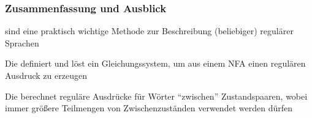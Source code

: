 \documentclass[onlymath]{beamer}
\begin{document}
\begin{frame}\frametitle{Zusammenfassung und Ausblick}

 sind eine praktisch wichtige Methode zur Beschreibung (beliebiger) regulärer Sprachen
\bigskip

Die  definiert und löst ein Gleichungssystem, um aus einem NFA einen regulären Ausdruck zu erzeugen
\bigskip

Die  berechnet reguläre Ausdrücke für Wörter "`zwischen"' Zustandspaaren, wobei immer größere Teilmengen von Zwischenzuständen verwendet werden dürfen
\bigskip


\end{frame}
\end{document}
